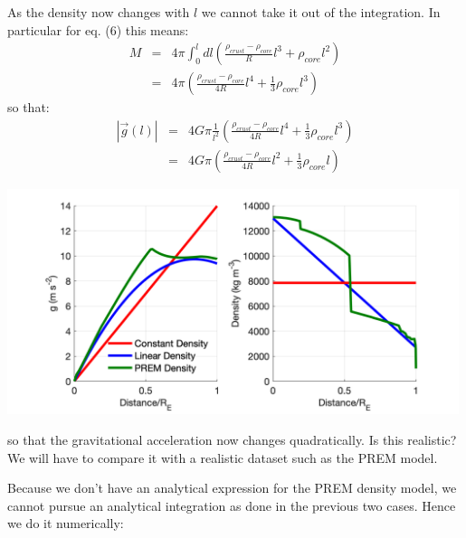 \documentclass[a4paper,12pt]{article}
\begin{document}
    As the density now changes with $l$ we cannot take it out of the integration. In particular for eq. (6) this means:
    \begin{eqnarray}
        M &=& 4\pi \int_0^l dl \left(\frac{\rho_{crust} - \rho_{core}}{R}l^3+\rho_{core}l^2\right)\\
          &=& 4\pi \left(\frac{\rho_{crust} - \rho_{core}}{4R}l^4+\frac{1}{3}\rho_{core}l^3 \right)
    \end{eqnarray}
    so that:
    \begin{eqnarray}
        |\vec{g}(l)| &=& 4 G \pi \frac{1}{l^2} \left(\frac{\rho_{crust} - \rho_{core}}{4R}l^4+\frac{1}{3}\rho_{core}l^3 \right) \\
        &=& 4 G \pi \left(\frac{\rho_{crust} - \rho_{core}}{4R}l^2+\frac{1}{3}\rho_{core}l \right)
    \end{eqnarray}
    \begin{center}
        \includegraphics[width=0.99\textwidth]{Figures/Gravimetry/Gravimetry01_GravityInsideEarth.png}
     \end{center}
     so that the gravitational acceleration now changes quadratically. Is this realistic? We will have to compare it with a realistic dataset such as the PREM model.

     \noindent Because we don't have an analytical expression for the PREM density model, we cannot pursue an analytical integration as done in the previous two cases. Hence we do it numerically:
     
\fi
\pagebreak
\end{document}
